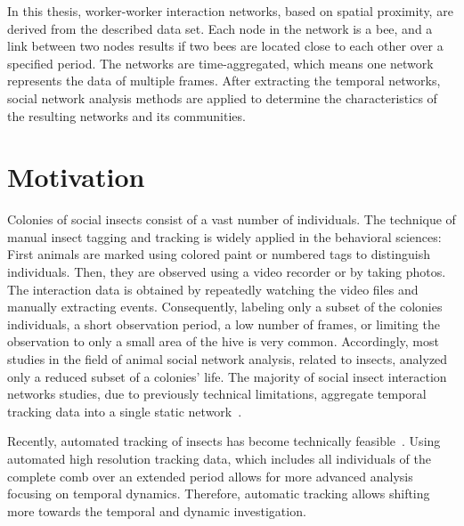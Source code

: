In this thesis, worker-worker interaction networks, based on spatial proximity, are derived from the described data set. Each node in the network is a bee, and a link between two nodes results if two bees are located close to each other over a specified period.
The networks are time-aggregated, which means one network represents the data of multiple frames.
After extracting the temporal networks, social network analysis methods are applied to determine the characteristics of the resulting networks and its communities.


\section{Motivation}
\label{sec:intro:motivation}
Colonies of social insects consist of a vast number of individuals.
The technique of manual insect tagging and tracking is widely applied in the behavioral sciences: First animals are marked using colored paint or numbered tags to distinguish individuals. Then, they are observed using a video recorder or by taking photos. The interaction data is obtained by repeatedly watching the video files and manually extracting events.
Consequently, labeling only a subset of the colonies individuals, a short observation period, a low number of frames, or limiting the observation to only a small area of the hive is very common.
Accordingly, most studies in the field of animal social network analysis, related to insects, analyzed only a reduced subset of a colonies' life. The majority of social insect interaction networks studies, due to previously technical limitations, aggregate temporal tracking data into a single static network~\cite[Chapter~15]{krause2014animal}.

Recently, automated tracking of insects has become technically feasible~\cite{wario2015automatic, crall2015beetag, fiala2005comparing}.
Using automated high resolution tracking data, which includes all individuals of the complete comb over an extended period allows for more advanced analysis focusing on temporal dynamics.
Therefore, automatic tracking allows shifting more towards the temporal and dynamic investigation.


